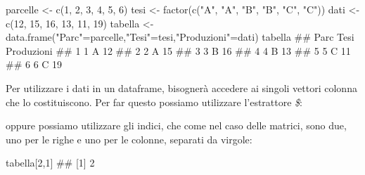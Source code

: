 \documentclass[a4paper,12pt,oneside]{book}
\newenvironment{Shaded}{\begin{snugshade}}{\end{snugshade}}
\newcommand{\DecValTok}[1]{#1}
\newcommand{\SpecialCharTok}[1]{#1}
\newcommand{\StringTok}[1]{#1}
\newcommand{\DocumentationTok}[1]{#1}
\newcommand{\OtherTok}[1]{#1}
\newcommand{\FunctionTok}[1]{#1}
\newcommand{\NormalTok}[1]{#1}
\begin{document}
\begin{Shaded}
\begin{Highlighting}[]
\NormalTok{parcelle  }\OtherTok{\textless{}{-}}  \FunctionTok{c}\NormalTok{(}\DecValTok{1}\NormalTok{, }\DecValTok{2}\NormalTok{, }\DecValTok{3}\NormalTok{, }\DecValTok{4}\NormalTok{, }\DecValTok{5}\NormalTok{, }\DecValTok{6}\NormalTok{)}
\NormalTok{tesi  }\OtherTok{\textless{}{-}}  \FunctionTok{factor}\NormalTok{(}\FunctionTok{c}\NormalTok{(}\StringTok{"A"}\NormalTok{, }\StringTok{"A"}\NormalTok{, }\StringTok{"B"}\NormalTok{, }\StringTok{"B"}\NormalTok{, }\StringTok{"C"}\NormalTok{, }\StringTok{"C"}\NormalTok{))}
\NormalTok{dati  }\OtherTok{\textless{}{-}}  \FunctionTok{c}\NormalTok{(}\DecValTok{12}\NormalTok{, }\DecValTok{15}\NormalTok{, }\DecValTok{16}\NormalTok{, }\DecValTok{13}\NormalTok{, }\DecValTok{11}\NormalTok{, }\DecValTok{19}\NormalTok{)}
\NormalTok{tabella  }\OtherTok{\textless{}{-}}  \FunctionTok{data.frame}\NormalTok{(}\StringTok{"Parc"}\OtherTok{=}\NormalTok{parcelle,}\StringTok{"Tesi"}\OtherTok{=}\NormalTok{tesi,}\StringTok{"Produzioni"}\OtherTok{=}\NormalTok{dati)}
\NormalTok{tabella}
\DocumentationTok{\#\#   Parc Tesi Produzioni}
\DocumentationTok{\#\# 1    1    A         12}
\DocumentationTok{\#\# 2    2    A         15}
\DocumentationTok{\#\# 3    3    B         16}
\DocumentationTok{\#\# 4    4    B         13}
\DocumentationTok{\#\# 5    5    C         11}
\DocumentationTok{\#\# 6    6    C         19}
\end{Highlighting}
\end{Shaded}

Per utilizzare i dati in un dataframe, bisognerà accedere ai singoli vettori colonna che lo costituiscono. Per far questo possiamo utilizzare l'estrattore \emph{\$}:

\begin{Shaded}
\end{Shaded}

oppure possiamo utilizzare gli indici, che come nel caso delle matrici, sono due, uno per le righe e uno per le colonne, separati da virgole:

\begin{Shaded}
\begin{Highlighting}[]
\NormalTok{tabella[}\DecValTok{2}\NormalTok{,}\DecValTok{1}\NormalTok{]}
\DocumentationTok{\#\# [1] 2}
\end{Highlighting}
\end{Shaded}
\end{document}
